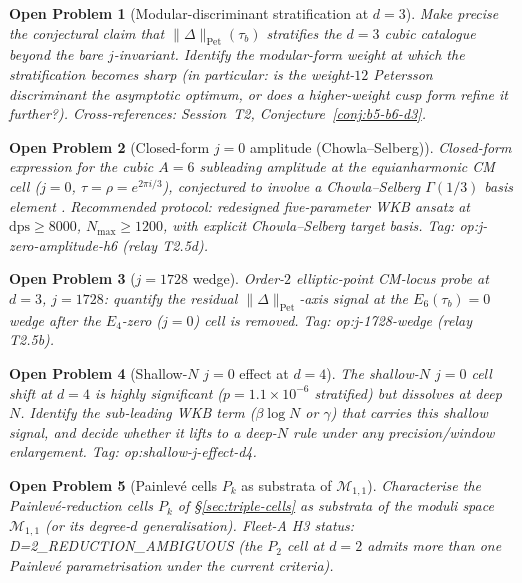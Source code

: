 \documentclass[11pt,a4paper]{article}
\newtheorem{problem}{Open Problem}
\theoremstyle{definition}
\theoremstyle{remark}
\newcommand{\PetN}[1]{\lVert #1 \rVert_{\mathrm{Pet}}}
\begin{document}
\begin{problem}[Modular-discriminant stratification at $d=3$]
\label{prob:modular-discriminant-stratification}
Make precise the conjectural claim that $\PetN{\Delta}(\tau_b)$
stratifies the $d=3$ cubic catalogue beyond the bare $j$-invariant.
Identify the modular-form weight at which the stratification
becomes sharp (in particular: is the weight-$12$ Petersson
discriminant the asymptotic optimum, or does a higher-weight cusp
form refine it further?). Cross-references: \cite{PCF2} Session~T2,
Conjecture~\ref{conj:b5-b6-d3}.
\end{problem}

\begin{problem}[Closed-form $j=0$ amplitude (Chowla--Selberg)]
\label{prob:j-zero-amplitude}
Closed-form expression for the cubic $A=6$ subleading amplitude
at the equianharmonic CM cell ($j=0$, $\tau = \rho =
e^{2\pi i/3}$), conjectured to involve a Chowla--Selberg
$\Gamma(1/3)$ basis element \cite{ChowlaSelberg1967}. Recommended
protocol: redesigned five-parameter WKB ansatz at $\mathrm{dps}
\geq 8000$, $N_{\max} \geq 1200$, with explicit Chowla--Selberg
target basis. Tag: \textsf{op:j-zero-amplitude-h6} (relay
\textsf{T2.5d}).
\end{problem}

\begin{problem}[$j=1728$ wedge]
\label{prob:j-1728-wedge}
Order-$2$ elliptic-point CM-locus probe at $d=3$, $j=1728$:
quantify the residual $\PetN{\Delta}$-axis signal at the
$E_6(\tau_b) = 0$ wedge after the $E_4$-zero ($j=0$) cell is
removed. Tag: \textsf{op:j-1728-wedge} (relay \textsf{T2.5b}).
\end{problem}

\begin{problem}[Shallow-$N$ $j=0$ effect at $d=4$]
\label{prob:shallow-j-effect-d4}
The shallow-$N$ $j=0$ cell shift at $d=4$ is highly significant
($p = 1.1\times 10^{-6}$ stratified) but dissolves at deep $N$.
Identify the sub-leading WKB term ($\beta \log N$ or $\gamma$) that
carries this shallow signal, and decide whether it lifts to a
deep-$N$ rule under any precision/window enlargement. Tag:
\textsf{op:shallow-j-effect-d4}.
\end{problem}

\begin{problem}[Painlev\'e cells $P_k$ as substrata of $\mathcal{M}_{1,1}$]
\label{prob:Pk-cells-structure}
Characterise the Painlev\'e-reduction cells $P_k$ of
\S\ref{sec:triple-cells} as substrata of the moduli space
$\mathcal{M}_{1,1}$ (or its degree-$d$ generalisation). Fleet-A
H3 status: \textsf{D=2\_REDUCTION\_AMBIGUOUS} (the $P_2$ cell at
$d=2$ admits more than one Painlev\'e parametrisation under the
current criteria).
\end{problem}
\end{document}
